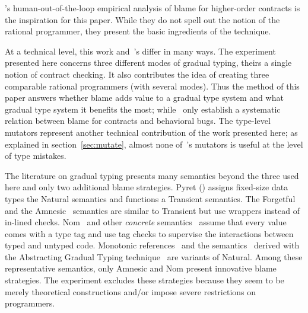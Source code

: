 
\citet{lksfd-popl-2020}'s human-out-of-the-loop empirical analysis of blame for
higher-order contracts is the inspiration for this paper.  While they do not
spell out the notion of the rational programmer, they present the basic
ingredients of the technique.

At a technical level, this work and~\citet{lksfd-popl-2020}'s differ in
many ways. The experiment presented here concerns three different modes of
gradual typing, theirs a single notion of contract checking.  It also
contributes the idea of creating three comparable rational programmers
(with several modes). Thus the method of this paper answers whether blame
adds value to a gradual type system and what gradual type system it
benefits the most; while~\citet{lksfd-popl-2020} only establish a
systematic relation between blame for contracts and behavioral bugs. The
type-level mutators represent another technical contribution of the work
presented here; as explained in section~\ref{sec:mutate}, almost none
of~\citet{lksfd-popl-2020}'s mutators is useful at the level of type
mistakes.

The literature on gradual typing presents many semantics beyond the three used
here and only two additional blame strategies.  Pyret
() assigns fixed-size data types the Natural
semantics and functions a Transient semantics. The Forgetful~\cite{cl-icfp-2017}
and the Amnesic~\cite{gfd-oopsla-2019} semantics are similar to Transient but
use wrappers instead of in-lined checks.  Nom~\cite{mt-oopsla-2017} and other
\emph{concrete\/} semantics~\cite{wnlov-popl-2010, rsfbv-popl-2015,
rzv-ecoop-2015, rat-oopsla-2017} assume that every value comes with a type tag
and use tag checks to supervise the interactions between typed and untyped code.
Monotonic references~\cite{svctg-esop-2015} and the
semantics~\cite{tlt-popl-2019, etg-icfp-19, tt-scp-20, tgt-popl-18, tt-sas-17}
derived with the Abstracting Gradual Typing technique~\cite{gct-popl-2016} are
variants of Natural.  Among these representative semantics, only Amnesic and Nom
present innovative blame strategies.  The experiment excludes these strategies
because they seem to be merely theoretical constructions and/or impose severe
restrictions on programmers.
 
